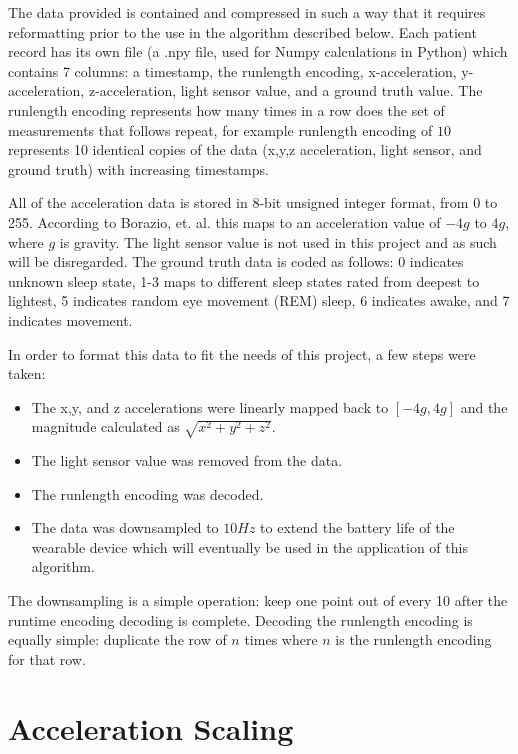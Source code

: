         The data provided is contained and compressed in such a way that it requires reformatting prior to the use in the algorithm described below. Each patient record has its own file (a .npy file, used for Numpy calculations in Python) which contains 7 columns: a timestamp, the runlength encoding, x-acceleration, y-acceleration, z-acceleration, light sensor value, and a ground truth value. The runlength encoding represents how many times in a row does the set of measurements that follows repeat, for example runlength encoding of $10$ represents 10 identical copies of the data (x,y,z acceleration, light sensor, and ground truth) with increasing timestamps. 

        All of the acceleration data is stored in 8-bit unsigned integer format, from 0 to 255. According to Borazio, et. al. this maps to an acceleration value of $-4g$ to $4g$, where $g$ is gravity. The light sensor value is not used in this project and as such will be disregarded. The ground truth data is coded as follows: 0 indicates unknown sleep state, 1-3 maps to different sleep states rated from deepest to lightest, 5 indicates random eye movement (REM) sleep, 6 indicates awake, and 7 indicates movement.

        In order to format this data to fit the needs of this project, a few steps were taken:

        \begin{itemize}
            \item The x,y, and z accelerations were linearly mapped back to $[-4g,4g]$ and the magnitude calculated as $\sqrt{x^2 + y^2 + z^2}$.
            \item The light sensor value was removed from the data.
            \item The runlength encoding was decoded.
            \item The data was downsampled to $10Hz$ to extend the battery life of the wearable device which will eventually be used in the application of this algorithm.
        \end{itemize}

        The downsampling is a simple operation: keep one point out of every 10 after the runtime encoding decoding is complete. Decoding the runlength encoding is equally simple: duplicate the row of $n$ times where $n$ is the runlength encoding for that row.

        \section{Acceleration Scaling}

